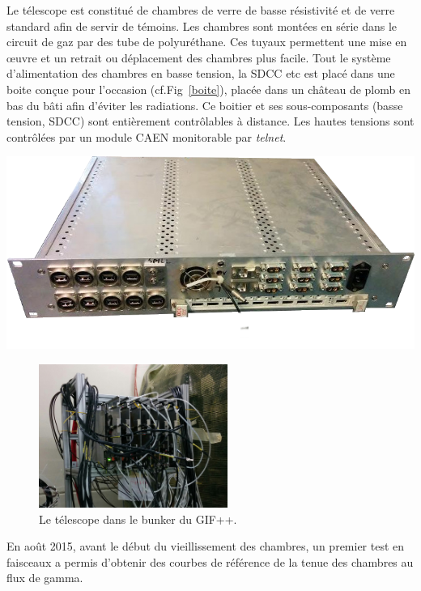 Le télescope est constitué de chambres de verre de basse résistivité et de verre standard afin de servir de témoins. Les chambres sont montées en série dans le circuit de gaz par des tube de polyuréthane. Ces tuyaux permettent une mise en œuvre et un retrait ou déplacement des chambres plus facile. Tout le système d'alimentation des chambres en basse tension, la SDCC etc est placé dans une boite conçue pour l'occasion (cf.Fig~\ref{boite}), placée dans un château de plomb en bas du bâti afin d'éviter les radiations. Ce boitier et ses sous-composants (basse tension, SDCC) sont entièrement contrôlables à distance. Les hautes tensions sont contrôlées par un module CAEN monitorable par \textit{telnet}.

\marginpar
{
	\centering
	\includegraphics[width=1.0\marginparwidth]{GLA/boite.png}
	\label{boite}
}

\begin{figure}[!ht]
	\centering
	\includegraphics[width=0.55\textwidth]{GLA/GIFppChambers.png}
	\caption{Le télescope dans le bunker du GIF++.}
	\label{GIFppChambers}
\end{figure}

En août \num{2015}, avant le début du vieillissement des chambres, un premier test en faisceaux a permis d'obtenir des courbes de référence de la tenue des chambres au flux de gamma.

